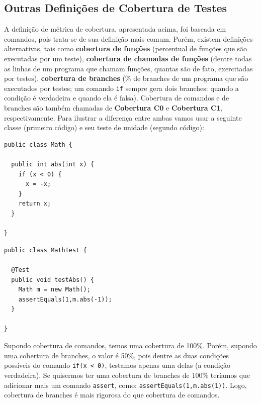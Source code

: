 \documentclass[
  11pt,
  twoside]{book}
\newcommand{\passthrough}[1]{#1}
\begin{document}
\hypertarget{outras-definiuxe7uxf5es-de-cobertura-de-testes}{%
\subsection{Outras Definições de Cobertura de
Testes}\label{outras-definiuxe7uxf5es-de-cobertura-de-testes}}

 A definição de métrica de
cobertura, apresentada acima, foi baseada em comandos, pois trata-se de
sua definição mais comum. Porém, existem definições alternativas, tais
como \textbf{cobertura de funções} (percentual de funções que são
executadas por um teste), \textbf{cobertura de chamadas de funções}
(dentre todas as linhas de um programa que chamam funções, quantas são
de fato, exercitadas por testes), \textbf{cobertura de branches} (\% de
branches de um programa que são executados por testes; um comando
\passthrough{\lstinline!if!} sempre gera dois branches: quando a
condição é verdadeira e quando ela é falsa). Cobertura de comandos e de
branches são também chamadas de \textbf{Cobertura C0} e
\textbf{Cobertura C1}, respectivamente. Para ilustrar a diferença entre
ambas vamos usar a seguinte classe (primeiro código) e seu teste de
unidade (segundo código):

\begin{lstlisting}
public class Math {

  public int abs(int x) {
    if (x < 0) {  
      x = -x;
    }  
    return x;
  }

}
\end{lstlisting}

\begin{lstlisting}
public class MathTest {

  @Test
  public void testAbs() {
    Math m = new Math();
    assertEquals(1,m.abs(-1));
  }

}
\end{lstlisting}

Supondo cobertura de comandos, temos uma cobertura de 100\%. Porém,
supondo uma cobertura de branches, o valor é 50\%, pois dentre as duas
condições possíveis do comando \passthrough{\lstinline!if(x < 0)!},
testamos apenas uma delas (a condição verdadeira). Se quisermos ter uma
cobertura de branches de 100\% teríamos que adicionar mais um comando
\passthrough{\lstinline!assert!}, como:
\passthrough{\lstinline!assertEquals(1,m.abs(1))!}. Logo, cobertura de
branches é mais rigorosa do que cobertura de comandos.
\end{document}
